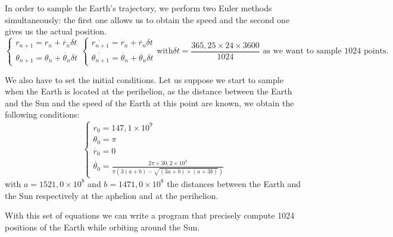In order to sample the Earth's trajectory, we perform two Euler methods simultaneously: the first one allows us to obtain the speed and the second one gives us the actual position.
\[
\begin{equation}
    \begin{cases}
    r_{n+1} = r_{n} + \dot{r_{n}} \delta t\\
    \theta_{n+1} = \theta_{n} + \dot{\theta_{n}} \delta t
\end{cases}
\end{equation}

\begin{equation}
    \begin{cases}
    \dot{r_{n+1}} = \dot{r_{n}} + \ddot{r_{n}} \delta t\\
    \dot{\theta_{n+1}} = \dot{\theta_{n}} + \ddot{\theta_{n}} \delta t
    \end{cases}
\end{equation}

\text{with}
\delta t = \frac{365,25 \times 24 \times 3600}{1024}
\text{ as we want to sample 1024 points.}
\]

We also have to set the initial conditions. Let us suppose we start to sample when the Earth is located at the perihelion, as the distance between the Earth and the Sun and the speed of the Earth at this point are known, we obtain the following conditions:
\[
\begin{equation}
    \begin{cases}
    r_{0} = 147,1 \times 10^{9}\\
    \theta_{0} = \pi\\
    \dot{r_{0}} = 0\\
    \dot{\theta_{0}} = \frac{2\pi \times 30,2 \times 10^{3}}{\pi \left( 3 (a + b) - \sqrt{(3a + b) \times (a + 3b)}\right)}
    \end{cases}
\end{equation}

\]
with \(a = 1521,0 \times 10^{8}\) and \(b = 1471,0 \times 10^{8}\) the distances between the Earth and the Sun respectively at the aphelion and at the perihelion.

With this set of equations we can write a program that precisely compute 1024 positions of the Earth while orbiting around the Sun.

